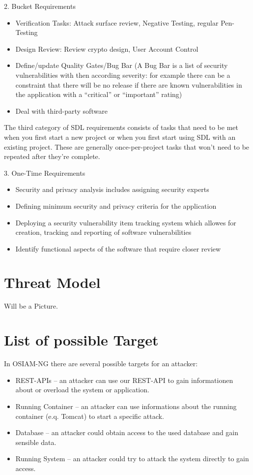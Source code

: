 2. Bucket Requirements
\begin{itemize}
	\item Verification Tasks: Attack surface review, Negative Testing, regular Pen-Testing
	\item Design Review: Review crypto design, User Account Control
	\item Define/update Quality Gates/Bug Bar (A Bug Bar is a list of security vulnerabilities with then according severity: for example there can be a constraint that there will be no release if there are known vulnerabilities in the application with a ``critical'' or ``important'' rating)
	\item Deal with third-party software
\end{itemize}

The third category of SDL requirements consists of tasks that need to be met when you first start a new project or when you first start using SDL with an existing project. These are generally once-per-project tasks that won’t need to be repeated after they’re complete.

3. One-Time Requirements
\begin{itemize}
	\item Security and privacy analysis includes assigning security experts
	\item Defining minimum security and privacy criteria for the application
	\item Deploying a security vulnerability item tracking system which allowes for creation, tracking and reporting of software vulnerabilities
	\item Identify functional aspects of the software that require closer review
\end{itemize}


\section{Threat Model}
Will be a Picture.

\section{List of possible Target}
In OSIAM-NG there are several possible targets for an attacker:
\begin{itemize}
\item REST-APIs -- an attacker can use our REST-API to gain informationen about or overload the system or application.
\item Running Container -- an attacker can use informations about the running container (e.q. Tomcat) to start a specific attack.
\item Database -- an attacker could obtain access to the used database and gain sensible data.
\item Running System -- an attacker could try to attack the system directly to gain access.
\end{itemize}

